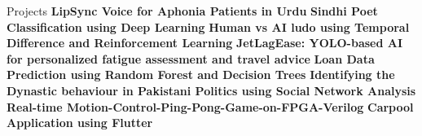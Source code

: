 \begin{rubric}{Projects}
\entry*\textbf{LipSync Voice for Aphonia Patients in Urdu}
\entry*\textbf{Sindhi Poet Classification using Deep Learning}
\entry*\textbf{Human vs AI ludo using Temporal Difference and Reinforcement Learning}
\entry*\textbf{JetLagEase: YOLO-based AI for personalized fatigue assessment and travel advice}
\entry*\textbf{Loan Data Prediction using Random Forest and Decision Trees}
\entry*\textbf{Identifying the Dynastic behaviour in Pakistani Politics using Social Network Analysis}
\entry*\textbf{Real-time Motion-Control-Ping-Pong-Game-on-FPGA-Verilog}
\entry*\textbf{Carpool Application using Flutter}

\end{rubric}
